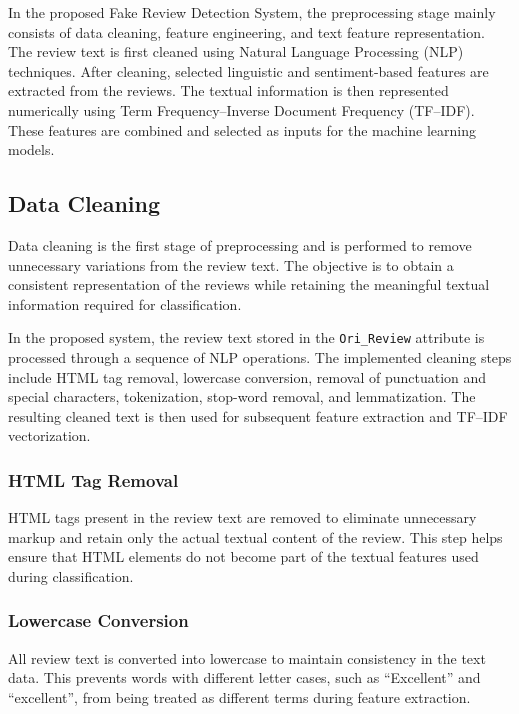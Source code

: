 \documentclass[12pt,a4paper]{report}
\begin{document}
In the proposed Fake Review Detection System, the preprocessing stage mainly consists of data cleaning, feature engineering, and text feature representation. The review text is first cleaned using Natural Language Processing (NLP) techniques. After cleaning, selected linguistic and sentiment-based features are extracted from the reviews. The textual information is then represented numerically using Term Frequency--Inverse Document Frequency (TF--IDF). These features are combined and selected as inputs for the machine learning models.

\subsection{Data Cleaning}

Data cleaning is the first stage of preprocessing and is performed to remove unnecessary variations from the review text. The objective is to obtain a consistent representation of the reviews while retaining the meaningful textual information required for classification.

In the proposed system, the review text stored in the \texttt{Ori\_Review} attribute is processed through a sequence of NLP operations. The implemented cleaning steps include HTML tag removal, lowercase conversion, removal of punctuation and special characters, tokenization, stop-word removal, and lemmatization. The resulting cleaned text is then used for subsequent feature extraction and TF--IDF vectorization.

\subsubsection*{HTML Tag Removal}

HTML tags present in the review text are removed to eliminate unnecessary markup and retain only the actual textual content of the review. This step helps ensure that HTML elements do not become part of the textual features used during classification.

\subsubsection*{Lowercase Conversion}

All review text is converted into lowercase to maintain consistency in the text data. This prevents words with different letter cases, such as ``Excellent'' and ``excellent'', from being treated as different terms during feature extraction.
\end{document}
